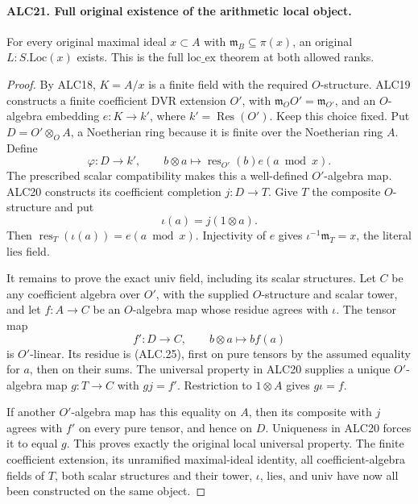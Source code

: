 \paragraph{ALC21. Full original existence of the arithmetic local object.}
\label{claim:ALC21}
For every original maximal ideal \(x\subset A\) with
\(\mathfrak m_B\subseteq\pi(x)\), an original
\(L:S.\mathrm{Loc}(x)\) exists.  This is the full
\(\mathrm{loc\_ex}\) theorem at both allowed ranks.

\begin{proof}
By ALC18, \(K=A/x\) is a finite field with the required
\(O\)-structure.  ALC19 constructs a finite coefficient
DVR extension \(O'\), with
\(\mathfrak m_OO'=\mathfrak m_{O'}\), and an
\(O\)-algebra embedding \(e:K\to k'\), where
\(k'=\operatorname{Res}(O')\).  Keep this choice fixed.
Put \(D=O'\otimes_O A\), a Noetherian ring because it
is finite over the Noetherian ring \(A\).  Define
\[
 \varphi:D\longrightarrow k',\qquad
       b\otimes a\longmapsto\operatorname{res}_{O'}(b)
                                  e(a\bmod x).
                                                        \tag{ALC.25}
\]
The prescribed scalar compatibility makes this a well-defined
\(O'\)-algebra map.  ALC20 constructs its coefficient
completion \(j:D\to T\).  Give \(T\) the composite
\(O\)-structure and put
\[
                     \iota(a)=j(1\otimes a).
                                                        \tag{ALC.26}
\]
Then
\(\operatorname{res}_T(\iota(a))=e(a\bmod x)\).
Injectivity of \(e\) gives
\(\iota^{-1}\mathfrak m_T=x\), the literal
\(\mathrm{lies}\) field.

It remains to prove the exact \(\mathrm{univ}\) field,
including its scalar structures.  Let \(C\) be any
coefficient algebra over \(O'\), with the supplied
\(O\)-structure and scalar tower, and let \(f:A\to C\)
be an \(O\)-algebra map whose residue agrees with
\(\iota\).  The tensor map
\[
               f':D\to C,\qquad b\otimes a\mapsto b f(a)
\]
is \(O'\)-linear.  Its residue is (ALC.25), first on
pure tensors by the assumed equality for \(a\), then
on their sums.  The universal property in ALC20 supplies
a unique \(O'\)-algebra map \(g:T\to C\) with
\(gj=f'\).  Restriction to \(1\otimes A\) gives
\(g\iota=f\).

If another \(O'\)-algebra map has this equality on \(A\),
then its composite with \(j\) agrees with \(f'\) on
every pure tensor, and hence on \(D\).  Uniqueness in
ALC20 forces it to equal \(g\).  This proves exactly the
original local universal property.  The finite coefficient
extension, its unramified maximal-ideal identity, all
coefficient-algebra fields of \(T\), both scalar structures
and their tower, \(\iota\), \(\mathrm{lies}\), and
\(\mathrm{univ}\) have now all been constructed on the
same object.
\end{proof}

